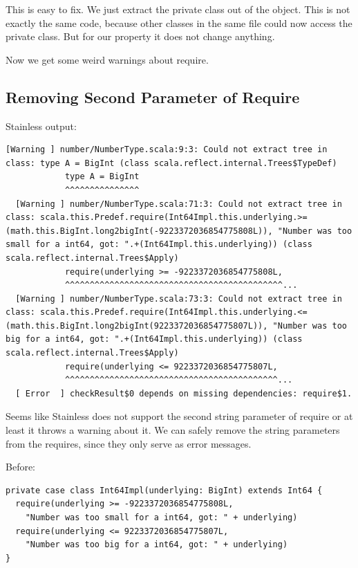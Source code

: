 \documentclass[runningheads]{llncs}
\begin{document}
This is easy to fix.
We just extract the private class out of the object.
This is not exactly the same code, because other classes in the same file could now access the private class.
But for our property it does not change anything.

Now we get some weird warnings about require.


\subsection{Removing Second Parameter of Require}

Stainless output:
\begin{lstlisting}[style=stainless]
  [Warning ] number/NumberType.scala:9:3: Could not extract tree in class: type A = BigInt (class scala.reflect.internal.Trees$TypeDef)
            type A = BigInt
            ^^^^^^^^^^^^^^^
  [Warning ] number/NumberType.scala:71:3: Could not extract tree in class: scala.this.Predef.require(Int64Impl.this.underlying.>=(math.this.BigInt.long2bigInt(-9223372036854775808L)), "Number was too small for a int64, got: ".+(Int64Impl.this.underlying)) (class scala.reflect.internal.Trees$Apply)
            require(underlying >= -9223372036854775808L,
            ^^^^^^^^^^^^^^^^^^^^^^^^^^^^^^^^^^^^^^^^^^^^...
  [Warning ] number/NumberType.scala:73:3: Could not extract tree in class: scala.this.Predef.require(Int64Impl.this.underlying.<=(math.this.BigInt.long2bigInt(9223372036854775807L)), "Number was too big for a int64, got: ".+(Int64Impl.this.underlying)) (class scala.reflect.internal.Trees$Apply)
            require(underlying <= 9223372036854775807L,
            ^^^^^^^^^^^^^^^^^^^^^^^^^^^^^^^^^^^^^^^^^^^...
  [ Error  ] checkResult$0 depends on missing dependencies: require$1.

\end{lstlisting}

Seems like Stainless does not support the second string parameter of require or at least it throws a warning about it.
We can safely remove the string parameters from the requires, since they only serve as error messages.

Before:
\begin{lstlisting}[style=scala]
private case class Int64Impl(underlying: BigInt) extends Int64 {
  require(underlying >= -9223372036854775808L,
    "Number was too small for a int64, got: " + underlying)
  require(underlying <= 9223372036854775807L,
    "Number was too big for a int64, got: " + underlying)
}
\end{lstlisting}
\end{document}
